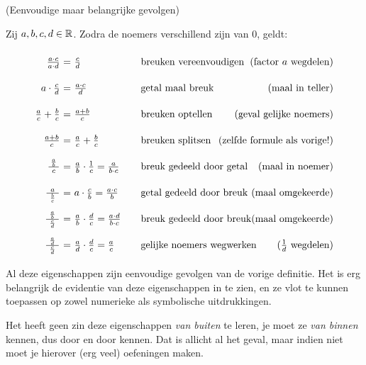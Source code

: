 \documentclass[numbers]{ximera}
\begin{document}
\begin{proposition} (Eenvoudige maar belangrijke gevolgen)
	
	Zij $a,b,c,d\in \mathbb{R}$. Zodra de noemers verschillend zijn van $0$, geldt:
\[
	\arraycolsep=1.4pt\def\arraystretch{2.2}
	\begin{array}{r@{\ }c@{\ }l@{\qquad}l}
		\frac{a\cdot c}{a\cdot d} &=& \frac{c}{d} 
			& \text{breuken vereenvoudigen} \hfill\text{(factor $a$ wegdelen)} \\
		a\cdot \frac{c}{d}   &=& \frac{a\cdot c}{d} 
			& \text{getal maal breuk}\hfill \text{(maal in teller)} \\
		\frac{a}{c}+\frac{b}{c}  &=& \frac{a+b}{c} 
			& \text{breuken optellen}\hfill\text{(geval gelijke noemers)} \\
		\frac{a+b}{c} &=& \frac{a}{c}+\frac{b}{c}  
			& \text{breuken splitsen} \hfill\text{(zelfde formule als vorige!)}\\
		\frac{\frac{a}{b}}{\ c\ } &=& \frac ab \cdot \frac 1c = \frac{a}{b\cdot c} 
		& \text{breuk gedeeld door getal}\hfill\text{(maal in noemer)}\\
		\frac{a}{\ \frac{b}{c}\ } &=& a\cdot \frac cb = \frac{a\cdot c}{b}
		& \text{getal gedeeld door breuk}\hfill\text{(maal omgekeerde)}\\
		\frac{\frac{a}{b}}{\ \frac{c}{d}\ } &=& \frac ab \cdot \frac dc =  \frac{a\cdot d}{b\cdot c}
		& \text{breuk gedeeld door breuk}\hfill\text{(maal omgekeerde)}\\
		\frac{\frac{a}{d}}{\ \frac{c}{d}\ } &=& \frac ad \cdot \frac dc =  \frac{a}{c}
		& \text{gelijke noemers wegwerken}\hfill\text{($\frac 1d$ wegdelen)}\\
	\end{array}
\]
\end{proposition}


Al deze eigenschappen zijn eenvoudige gevolgen van de vorige definitie. Het is erg belangrijk de evidentie van deze eigenschappen in te zien, en ze vlot te kunnen toepassen op zowel numerieke als symbolische uitdrukkingen.

Het heeft geen zin deze eigenschappen \textit{van buiten} te leren, je moet ze \textit{van binnen} kennen, dus door en door kennen. Dat is allicht al het geval, maar indien niet moet je hierover (erg veel) oefeningen maken.
\end{document}
